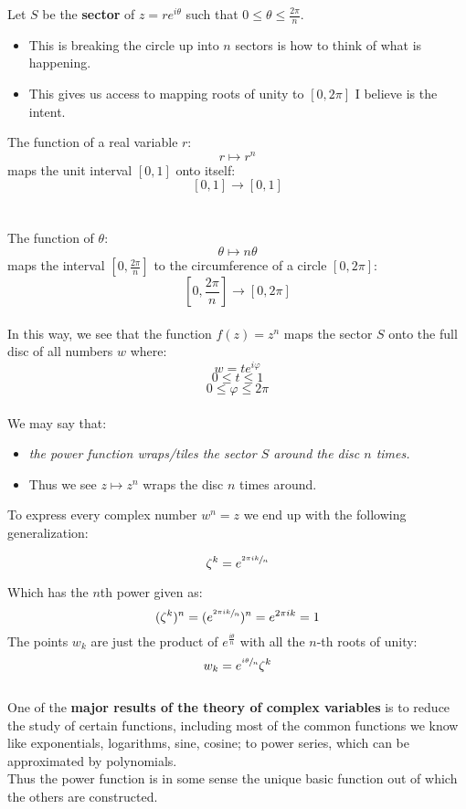 Let $S$ be the \textbf{sector} of $z = re^{i\theta}$ such that $0 \leq \theta \leq \frac{2\pi}{n}.$ 
\begin{itemize}
	\item This is breaking the circle up into $n$ sectors is how to think of what is happening. 
	\item This gives us access to mapping roots of unity to $[0, 2\pi]$ I believe is the intent.
\end{itemize}

The function of a real variable $r$:
\[r \mapsto r^n \]
maps the unit interval $[0, 1]$ onto itself:
\[[0, 1] \to [0, 1] \]
\\
\\
The function of $\theta$:
\[\theta \mapsto n\theta \]
maps the interval $[0, \frac{2\pi}{n}]$ to the circumference of a circle $[0, 2\pi]$:
\[ [0, \frac{2\pi}{n}] \to [0, 2\pi] \]
\\
In this way, we see that the function $f(z) = z^n$ maps the sector $S$ onto the full disc of all numbers $w$ where:
\[w = te^{i\varphi} \]
\[0 \leq t \leq 1\]
\[0 \leq \varphi \leq 2\pi \]
\\
We may say that:
\begin{itemize}
	\item \textit{the power function wraps/tiles the sector $S$ around the disc $n$ times.}
	\item Thus we see $z \mapsto z^n$ wraps the disc $n$ times around.
\end{itemize}

To express every complex number $w^n = z$ we end up with the following generalization:
\begin{defn}
	\[\zeta^k = e^{\sfrac{2\pi ik}{n}}\]
\end{defn}
Which has the $n$th power given as:
\[ (\zeta^k)^n = ( e^{\sfrac{2\pi ik}{n}} )^n = e^{2\pi ik} = 1 \]
The points $w_k$ are just the product of $e^{\frac{i\theta}{n}}$ with all the $n$-th roots of unity:
\[w_k = e^{\sfrac{i\theta}{n}}\zeta^k\]
\\
One of the \textbf{major results of the theory of complex variables} is to reduce the study of certain functions, including most of the common functions we know like exponentials, logarithms, sine, cosine; to power series, which can be approximated by polynomials.\\

Thus the power function is in some sense the unique basic function out of which the others are constructed.


